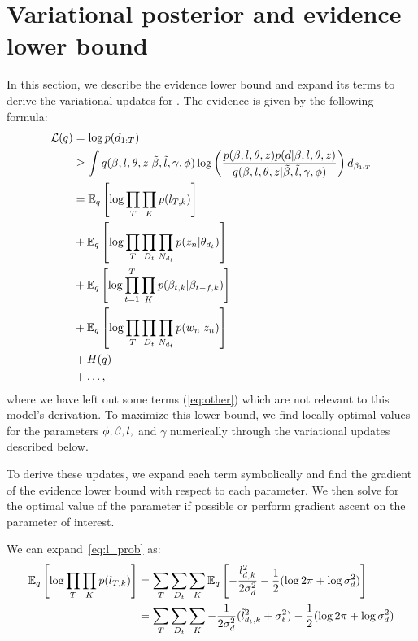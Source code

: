 \section{Variational posterior and evidence lower bound}
\label{section:docinf_appendix}
In this section, we describe the evidence lower bound and expand its
terms to derive the variational updates for .  The
evidence is given by the following formula:
\begin{align}
\label{eq:supplementary_docinf_elbo}
\mathcal{L}(q) &= \log p(\textbf{$d_{1:T}$}) \\
            &\ge \int q( \beta, l, \theta, z | \tilde{\beta}, \tilde{l}, \gamma, \phi)
                    \log \left(\frac{p(\beta, l, \theta, z)
		                     p(d | \beta, l, \theta, z)}
			 {q( \beta, l, \theta, z | \tilde{\beta}, \tilde{l}, \gamma, \phi)}
                    \right)
		    d_{\beta_{1:T}} \\
            & = \mathbb{E}_q\left[ \log \prod_T \prod_K p(l_{T,k}) \right] \label{eq:l_prob} \\
            & + \mathbb{E}_q\left[ \log \prod_T \prod_{D_t} \prod_{N_{d_t}} p(z_n | \theta_{d_t}) \right] \label{eq:z_prob} \\
            & + \mathbb{E}_q\left[ \log \prod_{t=1}^T \prod_K p(\beta_{t,k}
                                 		      | \beta_{t-f,k}) \right]
    \label{eq:beta_prob} \\
            & + \mathbb{E}_q\left[ \log \prod_T \prod_{D_t} \prod_{N_{d_t}} p(w_n | z_n) \right] \label{eq:w_prob} \\
            & + H(q) \\
            & + \ldots \label{eq:other},
\end{align}
where we have left out some terms (\ref{eq:other}) which are not
relevant to this model's derivation.  To maximize this lower bound, we
find locally optimal values for the parameters $\phi, \tilde{\beta}, \tilde{l},$ and
$\gamma$ numerically through the variational updates described below.

To derive these updates, we expand each term symbolically and find the
gradient of the evidence lower bound with respect to each parameter.
We then solve for the optimal value of the parameter if possible or
perform gradient ascent on the parameter of interest.  

We can expand~\ref{eq:l_prob} as:
\begin{align}
  \mathbb{E}_q\left[ \log \prod_T \prod_K p(l_{T,k}) \right]
  & = \sum_T \sum_{D_t} \sum_K \mathbb{E}_q\left[-\frac{l_{d_,k}^2}{2 \sigma^2_{d}} - \frac{1}{2} (\log 2 \pi + \log \sigma^2_{d}) \right]  \\ \nonumber
  & = \sum_T \sum_{D_t} \sum_K -\frac{1}{2 \sigma^2_{d}} (\tilde{l}_{d_t,k}^2 + {\sigma^2_{\ell}}) - \frac{1}{2} (\log 2 \pi + \log \sigma^2_{d}) \nonumber
\end{align}

